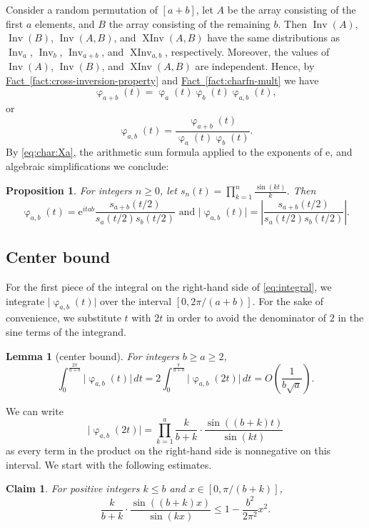 \documentclass[11pt]{article}
\numberwithin{equation}{section}
\newtheorem{lemma}[theorem]{Lemma}
\newtheorem{proposition}[theorem]{Proposition}
\newtheorem{claim}[theorem]{Claim}
\theoremstyle{definition}
\theoremstyle{plain}
\newcommand{\eee}{\mathrm e}
\newcommand{\expref}[2]{\hyperref[#2]{#1~\ref{#2}}}
\newcommand{\InvD}{\Inv}
\newcommand{\XInvD}{\XInv}
\DeclareMathOperator{\charfn}{\varphi}
\DeclareMathOperator{\Inv}{Inv}
\DeclareMathOperator{\XInv}{XInv}
\begin{document}
Consider a random permutation of $[a+b]$, let $A$ be the array consisting of the first $a$ elements, and $B$ the array consisting of the remaining $b$. Then $\Inv(A)$, $\Inv(B)$, $\Inv(A,B)$, and $\XInv(A,B)$ have the same distributions as $\InvD_a$, $\InvD_b$, $\InvD_{a+b}$, and $\XInvD_{a,b}$, respectively. Moreover, the values of $\Inv(A)$, $\Inv(B)$, and $\XInv(A,B)$ are independent. Hence, by \expref{Fact}{fact:cross-inversion-property} and \expref{Fact}{fact:charfn-mult} we have
\[\charfn_{a+b}(t)=\charfn_{a}(t)\charfn_{b}(t)\charfn_{a,b}(t), \]
or
\[\charfn_{a,b}(t)=\frac{\charfn_{a+b}(t)}{\charfn_a(t)\charfn_b(t)}. \]
By \eqref{eq:char:Xa}, the arithmetic sum formula applied to the exponents of $\eee$, and algebraic simplifications we conclude:
\begin{proposition}
\label{prop:characteristicfunction}
For integers $n\ge 0$, let $s_n(t)=\prod_{k=1}^n\frac{\sin(kt)}{k}$. Then 
    \[\charfn_{a,b}(t)=\eee^{itab}\frac{s_{a+b}(t/2)}{s_a(t/2)s_b(t/2)}
    \text{ and } \lvert\charfn_{a,b}(t)\rvert=\left| \frac{s_{a+b}(t/2)}{s_a(t/2)s_b(t/2)}\right|. 
    \]
\end{proposition}

\subsection{Center bound}
\label{sec:central}

For the first piece of the integral on the right-hand side of \eqref{eq:integral}, we integrate $\lvert\charfn_{a,b}(t)\rvert$ over the interval $[0,2\pi/(a+b)]$. For the sake of convenience, we substitute $t$ with $2t$ in order to avoid the denominator of $2$ in the sine terms of the integrand. 

\begin{lemma}[center bound]
    \label{lemma:center}
    For integers $b\ge a\ge 2$,
    \[ \int_0^{\frac{2\pi}{a+b}} \lvert\charfn_{a,b}(t)\rvert\, dt = 2 \int_0^{\frac{\pi}{a+b}} \lvert\charfn_{a,b}(2t)\rvert\, dt = O\left(\frac{1}{b\sqrt{a}}\right). \]    
\end{lemma}

We can write 
\[\lvert\charfn_{a,b}(2t)\rvert=\prod_{k=1}^{a} \frac{k}{b+k}\cdot\frac{\sin((b+k)t)}{\sin(kt)} \]
as every term in the product on the right-hand side is nonnegative on this interval. We start with the following estimates.

\begin{claim}
    \label{claim:center3}
    For positive integers $k\le b$ and $x\in [0,\pi/(b+k)]$,
    \[\frac{k}{b+k}\cdot \frac{\sin((b+k)x)}{\sin(kx)}\le 1-\frac{b^2}{2\pi^2}x^2. \]
\end{claim}
\end{document}

